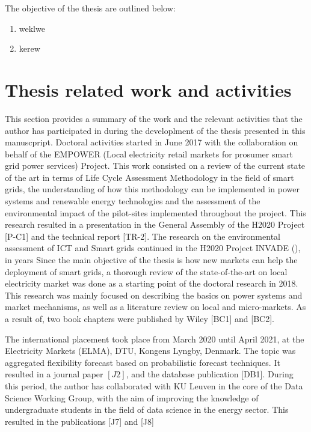 The objective of the thesis are outlined below: 

\begin{enumerate}
\item weklwe
\item kerew
\end{enumerate}


\newpage 
\section{Thesis related work and activities}
This section provides a summary of the work and the relevant activities that the author has participated in during the developlment of the thesis presented in this manuscpript.  	
Doctoral activities started in June 2017 with the collaboration on behalf of the EMPOWER (Local electricity retail markets for prosumer smart grid power services) Project. This work consisted on a review of the current state of the art in terms of Life Cycle Assessment Methodology in the field of smart grids, the understanding of how this methodology can be implemented in power systems and renewable energy technologies and the assessment of the environmental impact of the pilot-sites implemented throughout the project. This research resulted in a presentation in the General Assembly of the H2020 Project [P-C1] and the technical report [TR-2]. The research on the environmental assessment of ICT and Smart grids continued in the H2020 Project INVADE (), in years  
Since the main objective of the thesis is how new markets can help the deployment of smart grids, a thorough review of the state-of-the-art on local electricity market was done as a starting point of the doctoral research in 2018. This research was mainly focused on describing the basics on power systems and market mechanisms, as well as a literature review on local and micro-markets. As a result of, two book chapters were published by Wiley [BC1] and [BC2].  

The international placement took place from March 2020 until April 2021, at the Electricity Markets (ELMA), DTU, Kongens Lyngby, Denmark. The topic was aggregated flexibility forecast based on probabilistic forecast techniques. It resulted in a journal paper $[J2]$, and the database publication [DB1]. During this period, the author has collaborated with KU Leuven in the core of the Data Science Working Group, with the aim of improving the knowledge of undergraduate students in the field of data science in the energy sector. This resulted in the publications [J7] and [J8]

